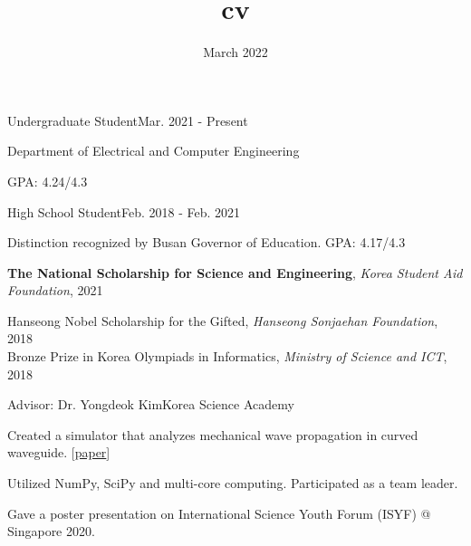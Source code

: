 \documentclass{cv}
\title{cv}
\date{March 2022}
\begin{document}
\cvheader






{Undergraduate Student}{Mar. 2021 - Present}
{
    \item Department of Electrical and Computer Engineering
    \item GPA: 4.24/4.3
}
{High School Student}{Feb. 2018 - Feb. 2021}
{
    \item Distinction recognized by Busan Governor of Education. GPA: 4.17/4.3
}



\textbf{The National Scholarship for Science and Engineering}, \textit{Korea Student Aid Foundation}, 2021

Hanseong Nobel Scholarship for the Gifted, \textit{Hanseong Sonjaehan Foundation}, 2018\\
Bronze Prize in Korea Olympiads in Informatics, \textit{Ministry of Science and ICT}, 2018

{Advisor: Dr. Yongdeok Kim}{Korea Science Academy}
{
    \item Created a simulator that analyzes mechanical wave propagation in curved waveguide. [\href{https://research.ksa.hs.kr/2019RNE_MAT02}{paper}]
    \item Utilized NumPy, SciPy and multi-core computing. Participated as a team leader.
    \item Gave a poster presentation on International Science Youth Forum (ISYF) @ Singapore 2020.
}



\end{document}
